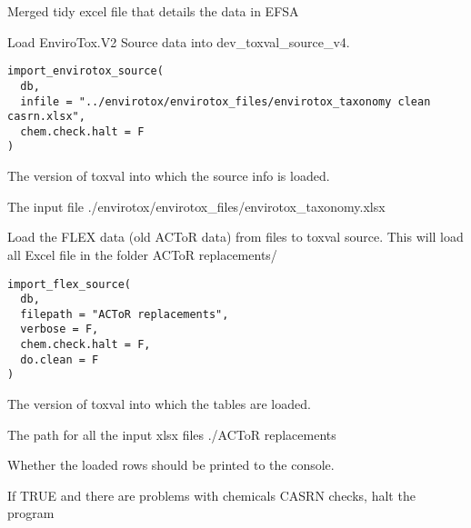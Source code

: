 \documentclass[letterpaper]{book}
\begin{document}
%
\begin{Value}
Merged tidy excel file that details the data in EFSA
\end{Value}
%
\begin{Description}\relax
Load EnviroTox.V2 Source data into dev\_toxval\_source\_v4.
\end{Description}
%
\begin{Usage}
\begin{verbatim}
import_envirotox_source(
  db,
  infile = "../envirotox/envirotox_files/envirotox_taxonomy clean casrn.xlsx",
  chem.check.halt = F
)
\end{verbatim}
\end{Usage}
%
\begin{Arguments}
\begin{ldescription}
\item[\code{db}] The version of toxval into which the source info is loaded.

\item[\code{infile}] The input file ./envirotox/envirotox\_files/envirotox\_taxonomy.xlsx
\end{ldescription}
\end{Arguments}
%
\begin{Description}\relax
Load the FLEX data (old ACToR data) from files to toxval source. This will load all
Excel file in the folder ACToR replacements/
\end{Description}
%
\begin{Usage}
\begin{verbatim}
import_flex_source(
  db,
  filepath = "ACToR replacements",
  verbose = F,
  chem.check.halt = F,
  do.clean = F
)
\end{verbatim}
\end{Usage}
%
\begin{Arguments}
\begin{ldescription}
\item[\code{db}] The version of toxval into which the tables are loaded.

\item[\code{filepath}] The path for all the input xlsx files ./ACToR replacements

\item[\code{verbose}] Whether the loaded rows should be printed to the console.

\item[\code{chem.check.halt}] If TRUE and there are problems with chemicals CASRN checks, halt the program
\end{ldescription}
\end{Arguments}
\end{document}
